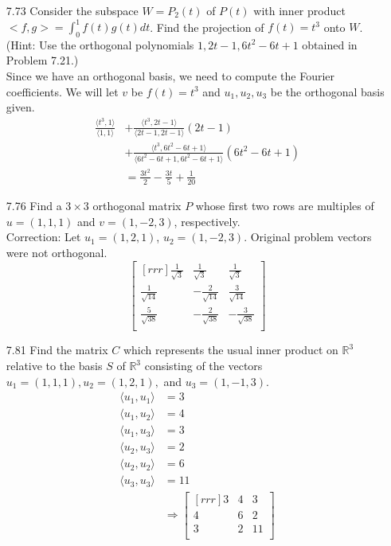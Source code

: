 \documentclass[12pt]{article}
\theoremstyle{definition}
\theoremstyle{plain}
\begin{document}
\begin{enumerate}
\item[7.73]Consider the subspace $W=P_2(t)$ of $P(t)$ with inner product $<f,g>=\int_0^1f(t)g(t)dt$. Find the projection of $f(t)=t^3$ onto $W$. (Hint: Use the orthogonal polynomials $1,2t-1,6t^2-6t+1$ obtained in Problem 7.21.)\\
	Since we have an orthogonal basis, we need to compute the Fourier coefficients. We will let $v$ be $f(t)=t^3$ and $u_1, u_2, u_3$ be the orthogonal basis given.
	\begin{align*}
	\frac{\langle t^3,1 \rangle}{\langle 1,1 \rangle} &+ \frac{\langle t^3,2t-1 \rangle}{\langle 2t-1,2t-1 \rangle}(2t-1)\\
	&+ \frac{\langle t^3,6t^2-6t+1 \rangle}{\langle 6t^2-6t+1,6t^2-6t+1 \rangle}(6t^2-6t+1)\\
	&= \frac{3t^2}{2}-\frac{3t}{5} + \frac{1}{20}
	\end{align*}

\item[7.76]Find a $3\times 3$ orthogonal matrix $P$ whose first two rows are multiples of $u=(1,1,1)$ and $v=(1,-2,3)$, respectively.\\
Correction: Let $u_1=(1,2,1)$, $u_2=(1,-2,3)$. Original problem vectors were not orthogonal.
	\[ \begin{bmatrix}[rrr]\frac{1}{\sqrt{3}}&\frac{1}{\sqrt{3}}&\frac{1}{\sqrt{3}}\\\frac{1}{\sqrt{14}}&-\frac{2}{\sqrt{14}}&\frac{3}{\sqrt{14}}\\\frac{5}{\sqrt{38}}&-\frac{2}{\sqrt{38}}&-\frac{3}{\sqrt{38}}\\\end{bmatrix} \]
\pagebreak
\item[7.81]Find the matrix $C$ which represents the usual inner product on $\mathbb{R}^3$ relative to the basis $S$ of $\mathbb{R}^3$ consisting of the vectors $u_1=(1,1,1),u_2=(1,2,1),$ and $u_3=(1,-1,3)$.\\
	\begin{align*}
	\langle u_1, u_1 \rangle &= 3\\
	\langle u_1, u_2 \rangle &= 4\\
	\langle u_1, u_3 \rangle &= 3\\
	\langle u_2, u_3 \rangle &= 2\\
	\langle u_2, u_2 \rangle &= 6\\
	\langle u_3, u_3 \rangle &= 11\\
	&\Rightarrow \begin{bmatrix}[rrr]3&4&3\\4&6&2\\3&2&11\\\end{bmatrix}
	\end{align*}


\end{enumerate}
\end{document}
